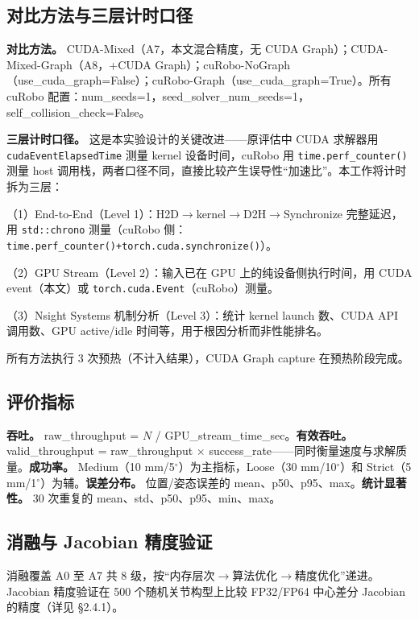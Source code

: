 \documentclass[twocolumn,a4paper,10pt]{ctexart}
\begin{document}
\subsection{对比方法与三层计时口径}

{\bfseries 对比方法。} CUDA-Mixed（A7，本文混合精度，无 CUDA Graph）；CUDA-Mixed-Graph（A8，+CUDA Graph）；cuRobo-NoGraph（use\_cuda\_graph=False）；cuRobo-Graph（use\_cuda\_graph=True）。所有 cuRobo 配置：num\_seeds=1，seed\_solver\_num\_seeds=1，self\_collision\_check=False。

{\bfseries 三层计时口径。} 这是本实验设计的关键改进——原评估中 CUDA 求解器用 \texttt{cudaEventElapsedTime} 测量 kernel 设备时间，cuRobo 用 \texttt{time.perf\_counter()} 测量 host 调用栈，两者口径不同，直接比较产生误导性``加速比''。本工作将计时拆为三层：

（1）End-to-End（Level 1）：H2D$\to$kernel$\to$D2H$\to$Synchronize 完整延迟，用 \texttt{std::chrono} 测量（cuRobo 侧：\texttt{time.perf\_counter()+torch.cuda.synchronize()}）。

（2）GPU Stream（Level 2）：输入已在 GPU 上的纯设备侧执行时间，用 CUDA event（本文）或 \texttt{torch.cuda.Event}（cuRobo）测量。

（3）Nsight Systems 机制分析（Level 3）：统计 kernel launch 数、CUDA API 调用数、GPU active/idle 时间等，用于根因分析而非性能排名。

所有方法执行 3 次预热（不计入结果），CUDA Graph capture 在预热阶段完成。

\subsection{评价指标}

{\bfseries 吞吐。} raw\_throughput = $N$ / GPU\_stream\_time\_sec。{\bfseries 有效吞吐。} valid\_throughput = raw\_throughput $\times$ success\_rate——同时衡量速度与求解质量。{\bfseries 成功率。} Medium（10 mm/5$^\circ$）为主指标，Loose（30 mm/10$^\circ$）和 Strict（5 mm/1$^\circ$）为辅。{\bfseries 误差分布。} 位置/姿态误差的 mean、p50、p95、max。{\bfseries 统计显著性。} 30 次重复的 mean、std、p50、p95、min、max。

\subsection{消融与 Jacobian 精度验证}

消融覆盖 A0 至 A7 共 8 级，按``内存层次$\to$算法优化$\to$精度优化''递进。Jacobian 精度验证在 500 个随机关节构型上比较 FP32/FP64 中心差分 Jacobian 的精度（详见 §2.4.1）。
\end{document}
